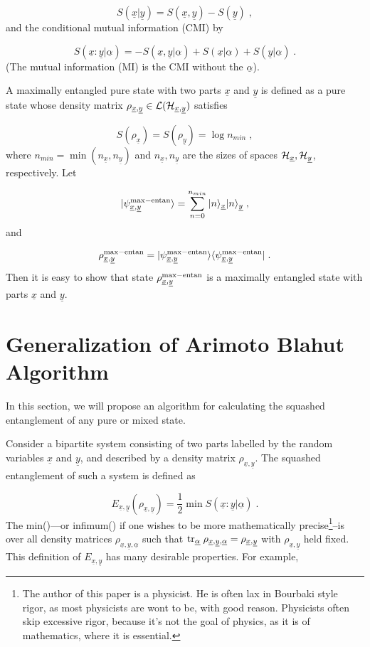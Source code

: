 \documentclass[12pt]{article}%
\newcommand{\bra}[1]{\langle#1|}
\newcommand{\ket}[1]{|#1\rangle}
\newcommand{\tr}[0]{{\rm tr }}
\newcommand{\beq}{\begin{equation}}
\newcommand{\eeq}{\end{equation}}
\newcommand{\ul}[1]{\underline{#1}}
\newcommand{\rvx}[0]{{\ul{x}}}
\newcommand{\rvy}[0]{{\ul{y}}}
\newcommand{\calh}[0]{{\cal H}}
\newcommand{\call}[0]{{\cal L}}
\newcommand{\rvalp}[0]{{\ul{\alpha}}}
\begin{document}
\beq
S(\rvx|\rvy) = S(\rvx, \rvy) - S(\rvy)
\;,
\eeq
and the conditional mutual information (CMI) by

\beq
S(\rvx : \rvy | \rvalp)=
-S(\rvx, \rvy| \rvalp)
+
S(\rvx| \rvalp)
+
S(\rvy| \rvalp)
\;.
\eeq
(The mutual information (MI) is the CMI without the $\rvalp$).


A maximally entangled pure state with two parts $\rvx$ and $\rvy$
is defined as a pure state whose density matrix $\rho_{\rvx,\rvy}\in \call({\calh_{\rvx, \rvy}})$
satisfies

\beq
S(\rho_\rvx)=S(\rho_\rvy)= \log n_{min}
\;,
\eeq
where $n_{min}=\min(n_\rvx, n_\rvy)$ and $n_\rvx, n_\rvy$
are the sizes of spaces $\calh_\rvx, \calh_\rvy$, respectively.
Let

\beq
\ket{\psi^{\rm max-entan}_{\rvx, \rvy}}=
\sum_{n=0}^{n_{min}}\ket{n}_\rvx\ket{n}_\rvy
\;,
\eeq
and

\beq
\rho^{\rm max-entan}_{\rvx, \rvy}=
\ket{\psi^{\rm max-entan}_{\rvx, \rvy}}
\bra{\psi^{\rm max-entan}_{\rvx, \rvy}}
\;.
\eeq
Then it is easy to show that
state $\rho^{\rm max-entan}_{\rvx, \rvy}$
is a maximally entangled state
with parts $\rvx$ and $\rvy$.





\section{Generalization of Arimoto Blahut Algorithm}
In this section, we will
propose an algorithm for
calculating the squashed entanglement
of any pure or mixed state.


Consider a bipartite system
consisting of two parts labelled
by the random variables $\rvx$ and $\rvy$,
and
described by a density matrix $\rho_{\rvx, \rvy}$.
The squashed entanglement of  such a system
is defined as

\beq
E_{\rvx, \rvy}(\rho_{\rvx, \rvy}) =
\frac{1}{2}
\min S(\rvx : \rvy|\rvalp)
\;.
\eeq
The min()---or infimum()
if one wishes to be more mathematically
precise\footnote{The author
of this paper is a physicist. He is
often lax in Bourbaki style rigor, as most physicists are wont to be, 
with good reason.  Physicists often
 skip excessive rigor, because it's not the goal of physics,
 as it is of mathematics, where it is essential.}--is
over all density matrices $\rho_{\rvx, \rvy,\rvalp}$
such that $\tr_\rvalp \; \rho_{\rvx, \rvy,\rvalp}=
\rho_{\rvx, \rvy}$ with $\rho_{\rvx, \rvy}$ held fixed.
This definition of $E_{\rvx,\rvy}$
has many desirable properties. For example,
\end{document}
